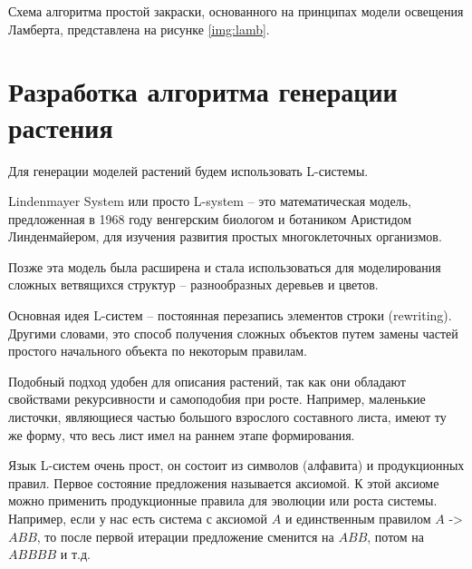 Схема алгоритма простой закраски, основанного на принципах
модели освещения Ламберта, представлена на рисунке \ref{img:lamb}.


\section{Разработка алгоритма генерации растения}

Для генерации моделей растений будем использовать L-системы.

Lindenmayer System или просто L-system \cite{l-systems} – это математическая модель, предложенная в 1968 году венгерским биологом и ботаником Аристидом
Линденмайером, для изучения развития простых многоклеточных организмов.

Позже эта модель была расширена и стала использоваться для моделирования сложных ветвящихся структур – разнообразных деревьев и цветов.

Основная идея L-систем – постоянная перезапись элементов строки (rewriting). Другими словами, это способ получения сложных объектов путем замены частей простого начального объекта по некоторым правилам. 

Подобный подход удобен для описания растений, так как они обладают свойствами рекурсивности и самоподобия при росте. Например, маленькие листочки, являющиеся частью большого взрослого составного листа, имеют ту же форму, что весь лист имел на раннем этапе формирования.

Язык L-систем очень прост, он состоит из символов (алфавита) и
продукционных правил. Первое состояние предложения называется аксиомой.
К этой аксиоме можно применить продукционные правила для эволюции или
роста системы. Например, если у нас есть система с аксиомой $A$ и единственным
правилом $A$ -> $ABB$, то после первой итерации предложение сменится на $ABB$,
потом на $ABBBB$ и т.д.

